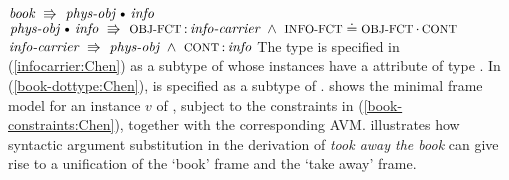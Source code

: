 \documentclass[output=paper,colorlinks,citecolor=brown,chinesefont]{langscibook}
\begin{document}
%
\ea\label{book-constraints:Chen}
\ea\label{book-dottype:Chen}
$\type{book}~\implic~\type{phys-obj}\dott\type{info}$\\
\ex\label{physinfo-facets:Chen}
$\type{phys-obj}\dott\type{info}~\implic~\feat{obj-fct}\D\type{info-carrier}\,\und\,\feat{info-fct}\patheq\feat{obj-fct}\CP\feat{cont}$\\
\ex\label{infocarrier:Chen}
$\type{info-carrier}~\implic~\type{phys-obj}\,\und\,\feat{cont}\D\type{info}$
\z
\z
The type  is specified in (\ref{infocarrier:Chen}) as a subtype of  whose instances have a  attribute of type .
In (\ref{book-dottype:Chen}),  is specified as a subtype of \dott{}.
 shows the minimal frame model for an instance $v$ of , subject to the constraints in (\ref{book-constraints:Chen}), together with the corresponding AVM.
 illustrates how syntactic argument substitution in the derivation of \emph{took away the book} can give rise to a unification of the `book' frame and the `take away' frame.


\end{document}
